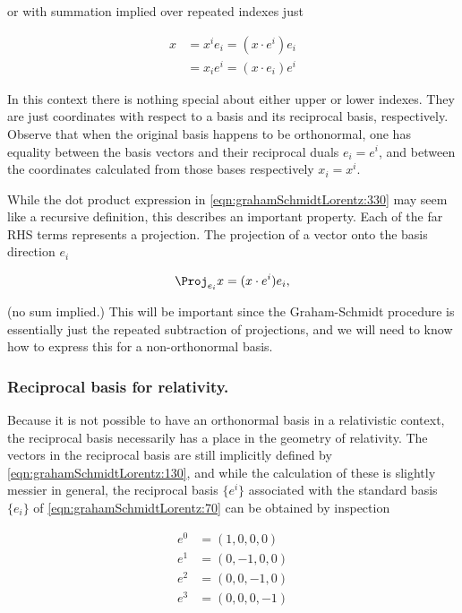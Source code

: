 \documentclass[iop,tighten]{emulateapj}
\begin{document}
or with summation implied over repeated indexes just

\begin{equation}\label{eqn:grahamSchmidtLorentz:330}
\begin{aligned}
x &= x^i e_i = (x \cdot e^i) e_i \\
  &= x_i e^i = (x \cdot e_i) e^i
\end{aligned}
\end{equation}

In this context there is nothing special about either upper or lower indexes.  They are just coordinates with respect to a basis and its reciprocal basis, respectively.  Observe that when the original basis happens to be orthonormal, one has equality between the basis vectors and their reciprocal duals $e_i = e^i$, and between the coordinates calculated from those bases respectively $x_i = x^i$.

While the dot product expression in \ref{eqn:grahamSchmidtLorentz:330} may seem like a recursive definition, this describes an important property.  Each of the far RHS terms represents a projection.  The projection of a vector onto the basis direction $e_i$

\begin{equation}\label{eqn:grahamSchmidtLorentz:560}
\Proj_{e_i} x = (x \cdot e^i) e_i,
\end{equation}

(no sum implied.)  This will be important since the Graham-Schmidt procedure is essentially just the repeated subtraction of projections, and we will need to know how to express this for a non-orthonormal basis.

\subsubsection{Reciprocal basis for relativity.}

Because it is not possible to have an orthonormal basis in a relativistic context, the reciprocal basis necessarily has a place in the geometry of relativity.  The vectors in the reciprocal basis are still implicitly defined by \ref{eqn:grahamSchmidtLorentz:130}, and while the calculation of these is slightly messier in general, the reciprocal basis $\{e^i\}$ associated with the standard basis $\{e_i\}$ of \ref{eqn:grahamSchmidtLorentz:70} can be obtained by inspection

\begin{equation}\label{eqn:grahamSchmidtLorentz:70b}
\begin{aligned}
e^0 &= (1, 0, 0, 0) \\
e^1 &= (0, -1, 0, 0) \\
e^2 &= (0, 0, -1, 0) \\
e^3 &= (0, 0, 0, -1) 
\end{aligned}
\end{equation}
\end{document}
